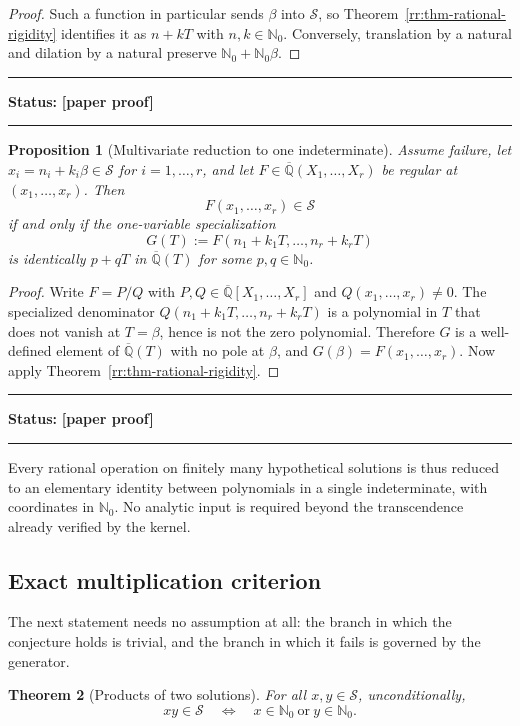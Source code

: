 \documentclass[11pt,oneside]{article}
\newtheorem{theorem}{Theorem}[section]
\newtheorem{proposition}[theorem]{Proposition}
\theoremstyle{definition}
\theoremstyle{remark}
\newcommand{\Nzero}{\mathbb N_0}
\newcommand{\Abar}{\overline{\mathbb Q}}
\newcommand{\Sol}{\mathcal S}
\newcommand{\statusnew}{\textcolor{newgreen}{\textbf{[paper proof]}}}
\newenvironment{statusbox}[1]
{\begin{center}\begin{minipage}{0.94\textwidth}\raggedright\hbadness=10000\hrule
\vspace{0.45em}\textbf{Status:} #1\par\vspace{0.35em}}
{\vspace{0.35em}\hrule\end{minipage}\end{center}}
\begin{document}
\begin{proof}
Such a function in particular sends $\beta$ into $\Sol$, so
Theorem~\ref{rr:thm-rational-rigidity} identifies it as $n+kT$ with $n,k\in\Nzero$.
Conversely, translation by a natural and dilation by a natural preserve
$\Nzero+\Nzero\beta$.
\end{proof}

\begin{statusbox}{\statusnew}
\end{statusbox}

\begin{proposition}[Multivariate reduction to one indeterminate]
\label{rr:prop-multivariate}
Assume failure, let $x_i=n_i+k_i\beta\in\Sol$ for $i=1,\ldots,r$, and let
$F\in\Abar(X_1,\ldots,X_r)$ be regular at $(x_1,\ldots,x_r)$.  Then
\[
 F(x_1,\ldots,x_r)\in\Sol
\]
if and only if the one-variable specialization
\[
 G(T):=F(n_1+k_1T,\ldots,n_r+k_rT)
\]
is identically $p+qT$ in $\Abar(T)$ for some $p,q\in\Nzero$.
\end{proposition}

\begin{proof}
Write $F=P/Q$ with $P,Q\in\Abar[X_1,\ldots,X_r]$ and $Q(x_1,\ldots,x_r)\ne0$.  The
specialized denominator $Q(n_1+k_1T,\ldots,n_r+k_rT)$ is a polynomial in $T$ that does not
vanish at $T=\beta$, hence is not the zero polynomial.  Therefore $G$ is a well-defined
element of $\Abar(T)$ with no pole at $\beta$, and $G(\beta)=F(x_1,\ldots,x_r)$.  Now apply
Theorem~\ref{rr:thm-rational-rigidity}.
\end{proof}

\begin{statusbox}{\statusnew}
\end{statusbox}

Every rational operation on finitely many hypothetical solutions is thus reduced to an
elementary identity between polynomials in a single indeterminate, with coordinates in
$\Nzero$.  No analytic input is required beyond the transcendence already verified by the
kernel.

\subsection{Exact multiplication criterion}

The next statement needs no assumption at all: the branch in which the conjecture holds is
trivial, and the branch in which it fails is governed by the generator.

\begin{theorem}[Products of two solutions]
\label{rr:thm-product}
For all $x,y\in\Sol$, unconditionally,
\[
 \boxed{\quad
 xy\in\Sol
 \quad\Longleftrightarrow\quad
 x\in\Nzero\ \text{or}\ y\in\Nzero .
 \quad}
\]
\end{theorem}
\end{document}
